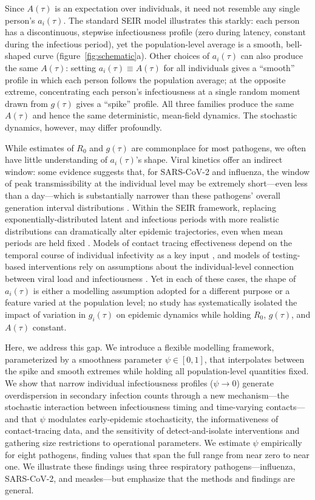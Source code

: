 \documentclass[10pt]{article}
\begin{document}
Since $A(\tau)$ is an expectation over individuals, it need not resemble any single person's $a_i(\tau)$. The standard SEIR model illustrates this starkly: each person has a discontinuous, stepwise infectiousness profile (zero during latency, constant during the infectious period), yet the population-level average is a smooth, bell-shaped curve (figure~\ref{fig:schematic}a). Other choices of $a_i(\tau)$ can also produce the same $A(\tau)$: setting $a_i(\tau) \equiv A(\tau)$ for all individuals gives a ``smooth'' profile in which each person follows the population average; at the opposite extreme, concentrating each person's infectiousness at a single random moment drawn from $g(\tau)$ gives a ``spike'' profile. All three families produce the same $A(\tau)$ and hence the same deterministic, mean-field dynamics. The stochastic dynamics, however, may differ profoundly.

While estimates of $R_0$ and $g(\tau)$ are commonplace for most pathogens, we often have little understanding of $a_i(\tau)$'s shape. Viral kinetics offer an indirect window: some evidence suggests that, for SARS-CoV-2 and influenza, the window of peak transmissibility at the individual level may be extremely short---even less than a day---which is substantially narrower than these pathogens' overall generation interval distributions \citep{goyal_viral_2021}. Within the SEIR framework, replacing exponentially-distributed latent and infectious periods with more realistic distributions can dramatically alter epidemic trajectories, even when mean periods are held fixed \citep{lloyd_realistic_2001, wearing_appropriate_2005, britton_epidemic_2009}. Models of contact tracing effectiveness depend on the temporal course of individual infectivity as a key input \citep{klinkenberg_effectiveness_2006}, and models of testing-based interventions rely on assumptions about the individual-level connection between viral load and infectiousness \citep{larremore_test_2021}. Yet in each of these cases, the shape of $a_i(\tau)$ is either a modelling assumption adopted for a different purpose or a feature varied at the population level; no study has systematically isolated the impact of variation in $g_i(\tau)$ on epidemic dynamics while holding $R_0$, $g(\tau)$, and $A(\tau)$ constant.

Here, we address this gap. We introduce a flexible modelling framework, parameterized by a smoothness parameter $\psi \in [0,1]$, that interpolates between the spike and smooth extremes while holding all population-level quantities fixed. We show that narrow individual infectiousness profiles ($\psi \to 0$) generate overdispersion in secondary infection counts through a new mechanism---the stochastic interaction between infectiousness timing and time-varying contacts---and that $\psi$ modulates early-epidemic stochasticity, the informativeness of contact-tracing data, and the sensitivity of detect-and-isolate interventions and gathering size restrictions to operational parameters. We estimate $\psi$ empirically for eight pathogens, finding values that span the full range from near zero to near one. We illustrate these findings using three respiratory pathogens---influenza, SARS-CoV-2, and measles---but emphasize that the methods and findings are general.
\end{document}
